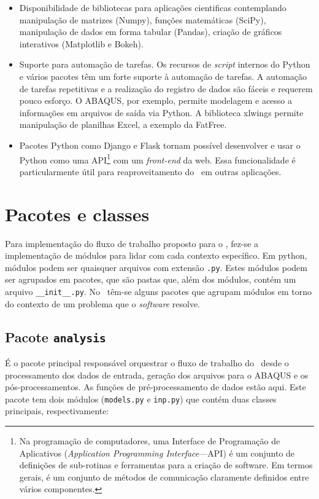 \begin{itemize}
    \item Disponibilidade de bibliotecas para aplicações cientificas contemplando manipulação de matrizes (Numpy), funções matemáticas (SciPy), manipulação de dados em forma tabular (Pandas), criação de gráficos interativos (Matplotlib e Bokeh).

    \item Suporte para automação de tarefas. Os recursos de \textit{script} internos do Python e vários pacotes têm um forte suporte à automação de tarefas. A automação de tarefas repetitivas e a realização do registro de dados são fáceis e requerem pouco esforço. O ABAQUS, por exemplo, permite modelagem e acesso a informações em arquivos de saída via Python. A biblioteca xlwings permite manipulação de planilhas Excel, a exemplo da FatFree.

    \item Pacotes Python como Django e Flask tornam possível desenvolver e usar o Python como uma API\footnote{Na programação de computadores, uma Interface de Programação de Aplicativos (\textit{Application Programming Interface}---API) é um conjunto de definições de sub-rotinas e ferramentas para a criação de software. Em termos gerais, é um conjunto de métodos de comunicação claramente definidos entre vários componentes.} com um \textit{front-end} da web. Essa funcionalidade é particularmente útil para reaproveitamento do \frame\  em outras aplicações.
\end{itemize}


\section{Pacotes e classes}


Para implementação do fluxo de trabalho proposto para o \frame, fez-se a implementação de módulos para lidar com cada contexto específico. Em python, módulos podem ser quaisquer arquivos com extensão \texttt{.py}. Estes módulos podem ser agrupados em pacotes, que são pastas que, além dos módulos, contém um arquivo \texttt{\_\_init\_\_.py}. No \frame\ têm-se alguns pacotes que agrupam módulos em torno do contexto de um problema que o \textit{software} resolve. %


\subsection{Pacote \texttt{analysis}}


É o pacote principal responsável orquestrar o fluxo de trabalho do \frame\ desde o processamento dos dados de entrada, geração dos arquivos para o ABAQUS e os pós-processamentos. As funções de pré-processamento de dados estão aqui. Este pacote tem dois módulos (\texttt{models.py} e \texttt{inp.py}) que contém duas classes principais, respectivamente:

